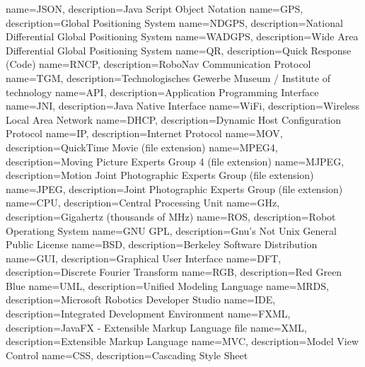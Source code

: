 \makeglossaries
{} {name=JSON, description={Java Script Object Notation}}
 {name=GPS, description={Global Positioning System }}
 {name=NDGPS, description={National Differential Global Positioning System }}
 {name=WADGPS, description={Wide Area Differential Global Positioning System }}
 {name=QR, description={Quick Response (Code) }}
 {name=RNCP, description={RoboNav Communication Protocol}}
 {name=TGM, description={Technologisches Gewerbe Museum / Institute of technology}}
 {name=API, description={Application Programming Interface}}
 {name=JNI, description={Java Native Interface}}
 {name=WiFi, description={Wireless Local Area Network}}
 {name=DHCP, description={Dynamic Host Configuration Protocol}}
 {name=IP, description={Internet Protocol}}
 {name=MOV, description={QuickTime Movie (file extension)}}
 {name=MPEG4, description={Moving Picture Experts Group 4 (file extension)}}
 {name=MJPEG, description={Motion Joint Photographic Experts Group (file extension)}}
 {name=JPEG, description={Joint Photographic Experts Group (file extension)}}
 {name=CPU, description={Central Processing Unit}}
 {name=GHz, description={Gigahertz (thousands of MHz)}}
 {name=ROS, description={Robot Operationg System}}
 {name=GNU GPL, description={Gnu's Not Unix General Public License}}
 {name=BSD, description={Berkeley Software Distribution}}
 {name=GUI, description={Graphical User Interface}}
 {name=DFT, description={Discrete Fourier Transform}}
 {name=RGB, description={Red Green Blue}}
 {name=UML, description={Unified Modeling Language}}
 {name=MRDS, description={Microsoft Robotics Developer Studio}}
 {name=IDE, description={Integrated Development Environment}}
 {name=FXML, description={JavaFX - Extensible Markup Language file}}
 {name=XML, description={Extensible Markup Language}}
 {name=MVC, description={Model View Control}}
 {name=CSS, description={Cascading Style Sheet}}

\renewcommand*\glspostdescription{\dotfill}

